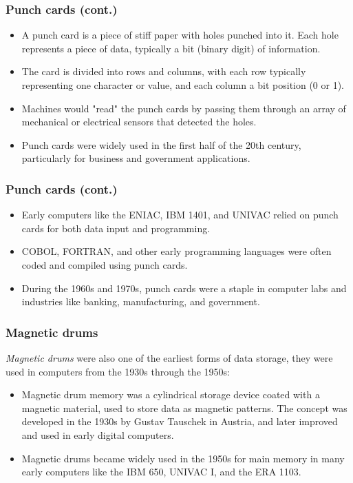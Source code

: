 \documentclass[aspectratio=169]{beamer}
\begin{document}
\begin{frame}
  \frametitle{Punch cards (cont.)}
  \begin{itemize}
    \item A punch card is a piece of stiff paper with holes punched into it. Each hole represents a piece of data, typically a bit (binary digit) of information. \pause
    \item The card is divided into rows and columns, with each row typically representing one character or value, and each column a bit position (0 or 1).  \pause
    \item Machines would "read" the punch cards by passing them through an array of mechanical or electrical sensors that detected the holes. \pause
    \item Punch cards were widely used in the first half of the 20th century, particularly for business and government applications. 
  \end{itemize}
\end{frame}

\begin{frame}
  \frametitle{Punch cards (cont.)}
  \begin{itemize}
    \item Early computers like the ENIAC, IBM 1401, and UNIVAC relied on punch cards for both data input and programming. \pause
    \item COBOL, FORTRAN, and other early programming languages were often coded and compiled using punch cards. \pause
    \item During the 1960s and 1970s, punch cards were a staple in computer labs and industries like banking, manufacturing, and government. 
  \end{itemize}
\end{frame}

\begin{frame}
  \frametitle{Magnetic drums}
  \textit{Magnetic drums} were also one of the earliest forms of data storage, they were used in computers from the 1930s through the 1950s: \pause
  \begin{itemize}
    \item Magnetic drum memory was a cylindrical storage device coated with a magnetic material, used to store data as magnetic patterns. The concept was developed in the 1930s by Gustav Tauschek in Austria, and later improved and used in early digital computers.\pause
    \item Magnetic drums became widely used in the 1950s for main memory in many early computers like the IBM 650, UNIVAC I, and the ERA 1103.
  \end{itemize}
\end{frame}
\end{document}

